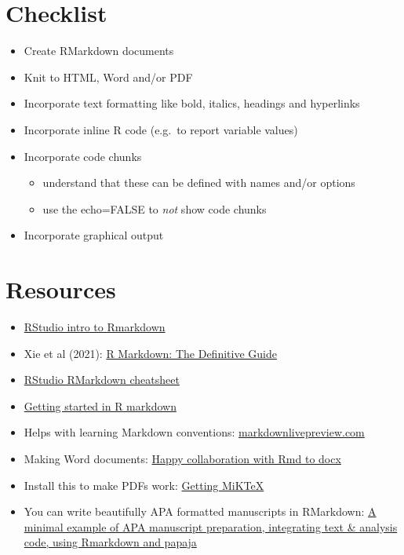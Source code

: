 \documentclass[
]{book}
\providecommand{\tightlist}{%
  \setlength{\itemsep}{0pt}\setlength{\parskip}{0pt}}
\begin{document}
\hypertarget{checklist-5}{%
\section{Checklist}\label{checklist-5}}

\begin{itemize}
\tightlist
\item
  Create RMarkdown documents
\item
  Knit to HTML, Word and/or PDF
\item
  Incorporate text formatting like bold, italics, headings and hyperlinks
\item
  Incorporate inline R code (e.g.~to report variable values)
\item
  Incorporate code chunks

  \begin{itemize}
  \tightlist
  \item
    understand that these can be defined with names and/or options
  \item
    use the echo=FALSE to \emph{not} show code chunks
  \end{itemize}
\item
  Incorporate graphical output
\end{itemize}

\hypertarget{resources-6}{%
\section{Resources}\label{resources-6}}

\begin{itemize}
\tightlist
\item
  \href{https://rmarkdown.rstudio.com/}{RStudio intro to Rmarkdown}
\item
  Xie et al (2021): \href{https://bookdown.org/yihui/rmarkdown/}{R Markdown: The Definitive Guide}
\item
  \href{https://github.com/rstudio/cheatsheets/raw/master/rmarkdown-2.0.pdf}{RStudio RMarkdown cheatsheet}
\item
  \href{https://www.r-bloggers.com/2020/02/getting-started-in-r-markdown-2/}{Getting started in R markdown}
\item
  Helps with learning Markdown conventions: \href{https://markdownlivepreview.com/}{markdownlivepreview.com}
\item
  Making Word documents: \href{https://rmarkdown.rstudio.com/articles_docx.html}{Happy collaboration with Rmd to docx}
\item
  Install this to make PDFs work: \href{https://miktex.org/download}{Getting MiKTeX}
\item
  You can write beautifully APA formatted manuscripts in RMarkdown: \href{https://github.com/tomstafford/rmarkdown_apa}{A minimal example of APA manuscript preparation, integrating text \& analysis code, using Rmarkdown and papaja}
\end{itemize}
\end{document}
